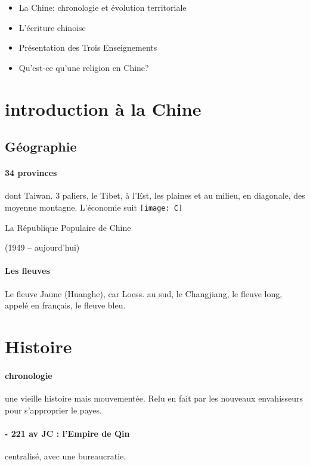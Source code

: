 \begin{itemize}
    \item  	La Chine: chronologie et évolution territoriale
    \item 	L’écriture chinoise
    \item 	Présentation des Trois Enseignements
    \item 	Qu’est-ce qu’une religion en Chine?

\end{itemize}


\section{introduction à la Chine}


\subsection{Géographie}
\paragraph{34 provinces} dont Taiwan. 3 paliers, le Tibet, à l'Est, les plaines et au milieu, en diagonale, des moyenne montagne. L'économie suit
\texttt{[image: C]}

La République Populaire de Chine
       
(1949 – aujourd’hui)

\paragraph{Les fleuves} Le fleuve Jaune (Huanghe), car Loess. au sud, le Changjiang, le fleuve long, appelé en français, le fleuve bleu.

\section{Histoire}
\paragraph{chronologie} une vieille histoire mais mouvementée. Relu en fait par les nouveaux envahisseurs pour s'approprier le payes. 

\paragraph{- 221 av JC : l'Empire de Qin} centralisé, avec une bureaucratie.

